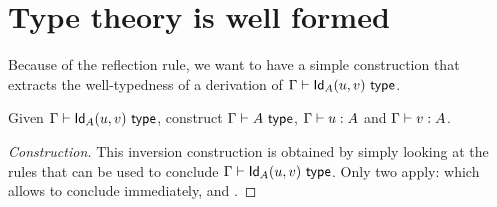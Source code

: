 \section{Type theory is well formed}
\label{sec:type-theory-well}

Because of the reflection rule, we want to have a simple construction that
extracts the well-typedness of a derivation of
$\Gamma \vdash \mathsf{Id}_{A}(u,v) \ \mathsf{type}$.

\begin{problem}
  Given $\Gamma \vdash \mathsf{Id}_{A}(u,v) \ \mathsf{type}$, construct
  $\Gamma \vdash A \ \mathsf{type}$, $\Gamma \vdash u : A$ and $\Gamma \vdash v : A$.
\end{problem}
%
\begin{proof}[Construction]
  This inversion construction is obtained by simply looking at the rules
  that can be used to conclude $\Gamma \vdash \mathsf{Id}_{A}(u,v) \ \mathsf{type}$.
  Only two apply: {\rlTyId} which allows to conclude immediately, and
  {\rlTyCtxConv}.
\end{proof}


